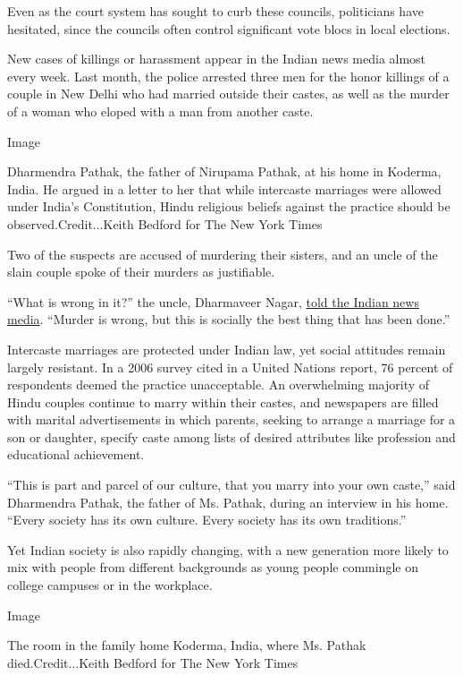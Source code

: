 Even as the court system has sought to curb these councils, politicians
have hesitated, since the councils often control significant vote blocs
in local elections.

New cases of killings or harassment appear in the Indian news media
almost every week. Last month, the police arrested three men for the
honor killings of a couple in New Delhi who had married outside their
castes, as well as the murder of a woman who eloped with a man from
another caste.

Image

Dharmendra Pathak, the father of Nirupama Pathak, at his home in
Koderma, India. He argued in a letter to her that while intercaste
marriages were allowed under India's Constitution, Hindu religious
beliefs against the practice should be observed.Credit...Keith Bedford
for The New York Times

Two of the suspects are accused of murdering their sisters, and an uncle
of the slain couple spoke of their murders as justifiable.

``What is wrong in it?'' the uncle, Dharmaveer Nagar,
\href{http://timesofindia.indiatimes.com/city/delhi/Two-taken-into-custody-for-justifying-honour-killings/articleshow/6086676.cms}{told
the Indian news media}. ``Murder is wrong, but this is socially the best
thing that has been done.''

Intercaste marriages are protected under Indian law, yet social
attitudes remain largely resistant. In a 2006 survey cited in a United
Nations report, 76 percent of respondents deemed the practice
unacceptable. An overwhelming majority of Hindu couples continue to
marry within their castes, and newspapers are filled with marital
advertisements in which parents, seeking to arrange a marriage for a son
or daughter, specify caste among lists of desired attributes like
profession and educational achievement.

``This is part and parcel of our culture, that you marry into your own
caste,'' said Dharmendra Pathak, the father of Ms. Pathak, during an
interview in his home. ``Every society has its own culture. Every
society has its own traditions.''

Yet Indian society is also rapidly changing, with a new generation more
likely to mix with people from different backgrounds as young people
commingle on college campuses or in the workplace.

Image

The room in the family home Koderma, India, where Ms. Pathak
died.Credit...Keith Bedford for The New York Times

